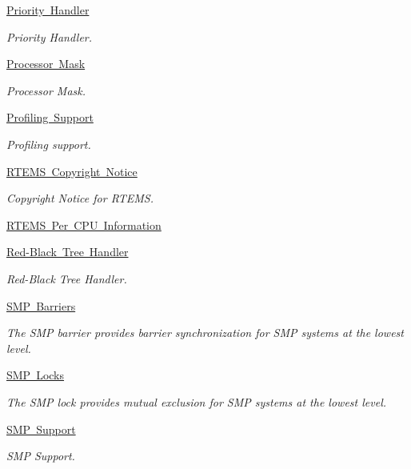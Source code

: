 \begin{DoxyCompactItemize}
\mbox{\hyperlink{group__RTEMSScorePriority}{Priority Handler}}
\begin{DoxyCompactList}\small\item\em Priority Handler. \end{DoxyCompactList}\item 
\mbox{\hyperlink{group__RTEMSScoreProcessorMask}{Processor Mask}}
\begin{DoxyCompactList}\small\item\em Processor Mask. \end{DoxyCompactList}\item 
\mbox{\hyperlink{group__RTEMSScoreProfiling}{Profiling Support}}
\begin{DoxyCompactList}\small\item\em Profiling support. \end{DoxyCompactList}\item 
\mbox{\hyperlink{group__RTEMSSuperCoreCopyright}{R\+T\+E\+M\+S Copyright Notice}}
\begin{DoxyCompactList}\small\item\em Copyright Notice for R\+T\+E\+MS. \end{DoxyCompactList}\item 
\mbox{\hyperlink{group__PerCPU}{R\+T\+E\+M\+S Per C\+P\+U Information}}
\item 
\mbox{\hyperlink{group__RTEMSScoreRBTree}{Red-\/\+Black Tree Handler}}
\begin{DoxyCompactList}\small\item\em Red-\/\+Black Tree Handler. \end{DoxyCompactList}\item 
\mbox{\hyperlink{group__RTEMSScoreSMPBarrier}{S\+M\+P Barriers}}
\begin{DoxyCompactList}\small\item\em The S\+MP barrier provides barrier synchronization for S\+MP systems at the lowest level. \end{DoxyCompactList}\item 
\mbox{\hyperlink{group__RTEMSScoreSMPLock}{S\+M\+P Locks}}
\begin{DoxyCompactList}\small\item\em The S\+MP lock provides mutual exclusion for S\+MP systems at the lowest level. \end{DoxyCompactList}\item 
\mbox{\hyperlink{group__RTEMSScoreSMP}{S\+M\+P Support}}
\begin{DoxyCompactList}\small\item\em S\+MP Support. \end{DoxyCompactList}\item 

\end{DoxyCompactItemize}
